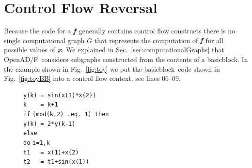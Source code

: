 \documentclass{book}
\newcommand{\basicblock}{basicblock}
\newcommand{\OpenADF}{OpenAD/F}
\newcommand{\bmf}{\mbox{\bf\em f}}
\newcommand{\bmx}{\mbox{\bf\em x}}
\newcommand{\refsec}[1]{{Sec.~\ref{#1}}}
\newcommand{\reffig}[1]{{Fig.~\ref{#1}}}
\begin{document}
\section{Control Flow Reversal} \label{sec:cfReversal}
Because the code for a $\bmf$ generally contains control flow constructs there is no 
single  computational graph 
$G$ that represents the computation of $\bmf$ for all possible values of $\bmx$.
We explained in \refsec{sec:computationalGraphs} that \OpenADF\ considers subgraphs constructed 
from the contents of a \basicblock.
In the example shown in \reffig{fig:toy} we put the \basicblock\ code shown in 
\reffig{fig:toyBB} into a control flow context, see lines 06--09.
\begin{figure}
  \begin{center}
    \begin{minipage}{.5\textwidth}
      \begin{tabbing}
        \hspace{.6cm}{\footnotesize \bf 00}\hspace{.5cm} \lstinline{y(k) = sin(x(1)*x(2))} \\
        \hspace{.6cm}{\footnotesize \bf 01}\hspace{.5cm} \lstinline{k    = k+1} \\
        \hspace{.6cm}{\footnotesize \bf 02}\hspace{.5cm} \lstinline{if} \=\lstinline{(mod(k,2) .eq. 1) then } \\
        \hspace{.6cm}{\footnotesize \bf 03}\hspace{.5cm} \>\lstinline{y(k) = 2*y(k-1)}  \\
        \hspace{.6cm}{\footnotesize \bf 04}\hspace{.5cm} \lstinline{else } \\
        \hspace{.6cm}{\footnotesize \bf 05}\hspace{.5cm} \>\lstinline{do} \=\lstinline{i=1,k } \\
        \hspace{.6cm}{\footnotesize \bf 06}\hspace{.5cm} \>\>\lstinline{t1   = x(1)+x(2) } \\
        \hspace{.6cm}{\footnotesize \bf 07}\hspace{.5cm} \>\>\lstinline{t2   = t1+sin(x(1)) } \\

\end{tabbing}
\end{minipage}
\end{center}
\end{figure}
\end{document}

